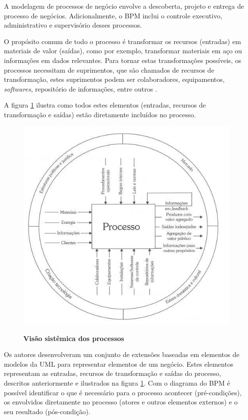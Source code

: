\documentclass[
	12pt,				%
	openright,			%
	oneside,			%
	a4paper,			%
	chapter=TITLE,		%
	section=TITLE,		%
	english,			%
	french,				%
	spanish,			%
	brazil				%
	]{abntex2}
\begin{document}
A modelagem de processos de negócio envolve a descoberta, projeto e entrega de processo de negócios. Adicionalmente, o BPM inclui o controle executivo, administrativo e supervisório desses processos.

O propósito comum de todo o processo é transformar os recursos (entradas) em materiais de valor (saídas), como por exemplo, transformar materiais em aço ou informações em dados relevantes. Para tornar estas transformações possíveis, os processos necessitam de suprimentos, que são chamados de recursos de transformação, estes suprimentos podem ser colaboradores, equipamentos, \textit{softwares}, repositório de informações, entre outros \cite{baldamBPM}.

A figura \ref{fig-processo} ilustra como todos estes elementos (entradas, recursos de transformação e saídas) estão diretamente incluídos no processo.
\\

\begin{figure}[htb]
	\begin{center}
		\caption{
			\textbf{Visão sistêmica dos processos}
		}\label{fig-processo}
		\includegraphics [scale=0.9]{imagens/processo.jpg}
		\label{fig-processo}
	\end{center}
\end{figure}

Os autores  desenvolveram um conjunto de extensões baseadas em elementos de modelos da UML para representar elementos de um negócio. Estes elementos representam as entradas, recursos de transformação e saídas do processo, descritos anteriormente e ilustrados na figura \ref{fig-processo}. Com o diagrama do BPM é possível identificar o que é necessário para o processo acontecer (pré-condições), os envolvidos diretamente no processo (atores e outros elementos externos) e o seu resultado (pós-condição).
\end{document}

